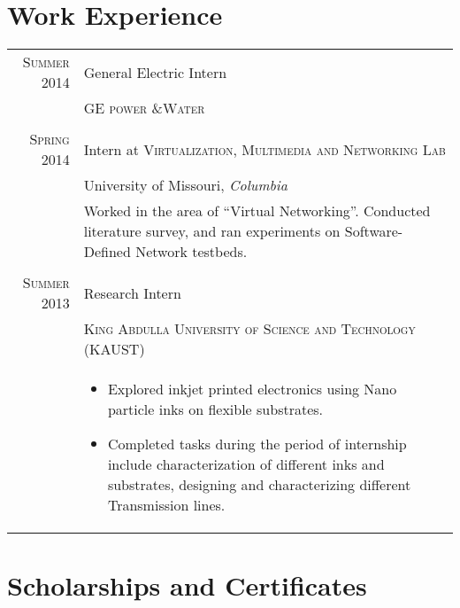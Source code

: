 \documentclass[a4paper,10pt]{article} %
\begin{document}
\section{Work Experience}

\begin{tabular}{r|p{11cm}}
\textsc{Summer 2014} & General Electric Intern\\ 
&  \textsc{GE power \&Water}\\
\multicolumn{2}{c}{} \\


\textsc{Spring 2014} & Intern at \textsc{Virtualization, Multimedia and Networking Lab }\\
& University of Missouri, \emph{Columbia}\\
& \footnotesize{Worked in the area of “Virtual Networking”. Conducted literature survey, and ran experiments on Software-Defined Network testbeds. }\\
\multicolumn{2}{c}{} \\


\textsc{Summer 2013} & Research Intern \\
& \textsc{King Abdulla University of Science and Technology (KAUST)}\\
& \footnotesize{ \begin{itemize}
\item Explored inkjet printed electronics using Nano particle inks on flexible substrates. 
\item Completed tasks during the period of internship include characterization of different inks and substrates, designing and characterizing different Transmission lines.
\end{itemize}
}
\end{tabular}

\section{Scholarships and Certificates}
	
\end{document}
